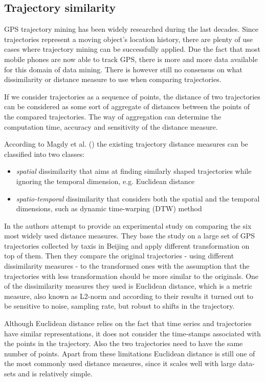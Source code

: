 \subsection{Trajectory similarity}
GPS trajectory mining has been widely researched during the last decades. Since trajectories represent a moving object's location history, there are plenty of use cases where trajectory mining can be successfully applied.  Due the fact that most mobile phones are now able to track GPS, there is more and more data available for this domain of data mining. There is however still no consensus on what dissimilarity or distance measure to use when comparing trajectories.

If we consider trajectories as a sequence of points, the distance of two trajectories can be considered as some sort of aggregate of distances between the points of the compared trajectories. The way of aggregation can determine the computation time, accuracy and sensitivity of the distance measure. 

According to Magdy et al. (\cite{traj-sim-rev}) the existing trajectory distance measures can be classified into two classes: 
\begin{itemize}
    \item \textit{spatial} dissimilarity that aims at finding similarly  shaped trajectories while ignoring the temporal dimension, e.g. Euclidean distance
    \item \textit{spatio-temporal} dissimilarity that considers both the spatial and the temporal dimensions, such as dynamic time-warping (DTW) method
\end{itemize}

In \cite{traj-sim} the authors attempt to provide an experimental study on comparing the six most widely used distance measures. They base the study on a large set of GPS trajectories collected by taxis in Beijing and apply different transformation on top of them. Then they compare the original trajectories - using different dissimilarity measures - to the transformed ones with the assumption that the trajectories with less transformation should be more similar to the originals. One of the dissimilarity measures they used is Euclidean distance, which is a metric measure, also known as L2-norm and according to their results it turned out to be sensitive to noise, sampling rate, but robust to shifts in the trajectory.

Although Euclidean distance relies on the fact that time series and trajectories have similar representations, it does not consider the time-stamps associated with the points in the trajectory. Also the two trajectories need to have the same number of points. Apart from these limitations Euclidean distance is still one of the most commonly used distance measures, since it scales well with large data-sets and is relatively simple. 

